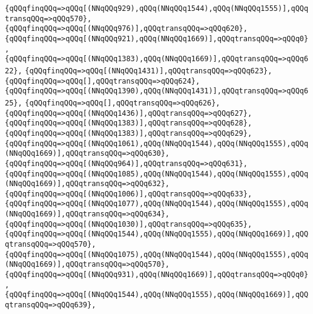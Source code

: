 \verb|{qQQqfinqQQq=>qQQq[(NNqQQq929),qQQq(NNqQQq1544),qQQq(NNqQQq1555)],qQQqtransqQQq=>qQQq570},|\newline
\verb|{qQQqfinqQQq=>qQQq[(NNqQQq976)],qQQqtransqQQq=>qQQq620},|\newline
\verb|{qQQqfinqQQq=>qQQq[(NNqQQq921),qQQq(NNqQQq1669)],qQQqtransqQQq=>qQQq0},|\newline
\verb|{qQQqfinqQQq=>qQQq[(NNqQQq1383),qQQq(NNqQQq1669)],qQQqtransqQQq=>qQQq622},|\newline
\verb|{qQQqfinqQQq=>qQQq[(NNqQQq1431)],qQQqtransqQQq=>qQQq623},|\newline
\verb|{qQQqfinqQQq=>qQQq[],qQQqtransqQQq=>qQQq624},|\newline
\verb|{qQQqfinqQQq=>qQQq[(NNqQQq1390),qQQq(NNqQQq1431)],qQQqtransqQQq=>qQQq625},|\newline
\verb|{qQQqfinqQQq=>qQQq[],qQQqtransqQQq=>qQQq626},|\newline
\verb|{qQQqfinqQQq=>qQQq[(NNqQQq1436)],qQQqtransqQQq=>qQQq627},|\newline
\verb|{qQQqfinqQQq=>qQQq[(NNqQQq1383)],qQQqtransqQQq=>qQQq628},|\newline
\verb|{qQQqfinqQQq=>qQQq[(NNqQQq1383)],qQQqtransqQQq=>qQQq629},|\newline
\verb|{qQQqfinqQQq=>qQQq[(NNqQQq1061),qQQq(NNqQQq1544),qQQq(NNqQQq1555),qQQq(NNqQQq1669)],qQQqtransqQQq=>qQQq630},|\newline
\verb|{qQQqfinqQQq=>qQQq[(NNqQQq964)],qQQqtransqQQq=>qQQq631},|\newline
\verb|{qQQqfinqQQq=>qQQq[(NNqQQq1085),qQQq(NNqQQq1544),qQQq(NNqQQq1555),qQQq(NNqQQq1669)],qQQqtransqQQq=>qQQq632},|\newline
\verb|{qQQqfinqQQq=>qQQq[(NNqQQq1006)],qQQqtransqQQq=>qQQq633},|\newline
\verb|{qQQqfinqQQq=>qQQq[(NNqQQq1077),qQQq(NNqQQq1544),qQQq(NNqQQq1555),qQQq(NNqQQq1669)],qQQqtransqQQq=>qQQq634},|\newline
\verb|{qQQqfinqQQq=>qQQq[(NNqQQq1030)],qQQqtransqQQq=>qQQq635},|\newline
\verb|{qQQqfinqQQq=>qQQq[(NNqQQq1544),qQQq(NNqQQq1555),qQQq(NNqQQq1669)],qQQqtransqQQq=>qQQq570},|\newline
\verb|{qQQqfinqQQq=>qQQq[(NNqQQq1075),qQQq(NNqQQq1544),qQQq(NNqQQq1555),qQQq(NNqQQq1669)],qQQqtransqQQq=>qQQq570},|\newline
\verb|{qQQqfinqQQq=>qQQq[(NNqQQq931),qQQq(NNqQQq1669)],qQQqtransqQQq=>qQQq0},|\newline
\verb|{qQQqfinqQQq=>qQQq[(NNqQQq1544),qQQq(NNqQQq1555),qQQq(NNqQQq1669)],qQQqtransqQQq=>qQQq639},|\newline
